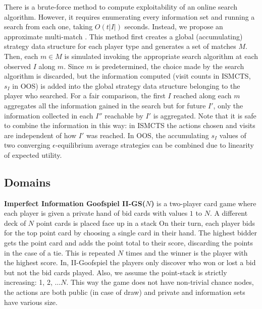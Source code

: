 \documentclass{aamas2015}
\newcounter{vlNoteCounter}
\newcommand{\vlnote}[1]{{\scriptsize \color{blue} $\blacksquare$ \refstepcounter{vlNoteCounter}\textsf{[VL]$_{\arabic{vlNoteCounter}}$:{#1}}}}
\renewcommand{\vlnote}[1]{}
\newcommand{\defword}[1]{\textbf{\boldmath{#1}}}
\begin{document}
There is a brute-force method to compute exploitability of an online search algorithm. 
However, it requires enumerating every information set and running a search from each one, taking $O(t |I|)$ seconds.
Instead, we propose an approximate multi-match \defword{aggregate method}. 
This method first creates a global (accumulating) strategy data structure for each player type and generates a 
set of matches $M$. Then, each $m \in M$ is simulated invoking the appropriate search algorithm at each observed 
$I$ along $m$. 
Since $m$ is predetermined, the choice made by the search algorithm is discarded, but the information computed 
(visit counts in ISMCTS, $s_I$ in OOS) is added into the global strategy data structure belonging to the player
who searched. 
For a fair comparison, the first $I$ reached along each $m$ aggregates all the information gained in the search 
but for future $I'$, only the information collected in each $I''$ reachable by $I'$ is aggregated.
Note that it is safe to combine the information in this way: in ISMCTS the actions chosen and visits are independent of 
how $I'$ was reached. In OOS, the accumulating $s_I$ values of two converging $\epsilon$-equilibrium average 
strategies can be combined due to linearity of expected utility. 

\subsection{Domains}
\vlnote{comment on domain sizes}

\textbf{Imperfect Information Goofspiel II-GS($N$)} is a two-player card game where each player is
given a private hand of bid cards with values $1$ to $N$. A different
deck of $N$ point cards is placed face up in a stack 
On their turn, each player bids for the top point card by 
choosing a single card in their hand. 
The highest bidder gets the point card and adds the point total to their score, discarding
the points in the case of a tie. 
This is repeated $N$ times and the winner is the player with the highest score.
In, II-Goofspiel the players only discover who won or lost a bid but not the bid cards played.
Also, we assume the point-stack is strictly increasing: 1, 2, $\ldots N$.
This way the game does not have non-trivial chance nodes, the actions are both public (in case of draw) and private and information sets have various size.
\end{document}
